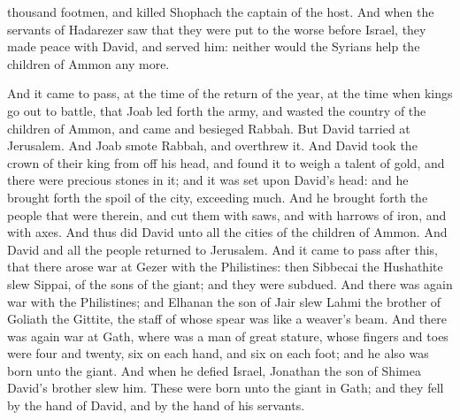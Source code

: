 thousand footmen, and killed Shophach the captain of the host. And when the servants of Hadarezer saw that they were put to the worse before Israel, they made peace with David, and served him: neither would the Syrians help the children of Ammon any more. 

And it came to pass, at the time of the return of the year, at the time when kings go out to battle, that Joab led forth the army, and wasted the country of the children of Ammon, and came and besieged Rabbah. But David tarried at Jerusalem. And Joab smote Rabbah, and overthrew it. And David took the crown of their king from off his head, and found it to weigh a talent of gold, and there were precious stones in it; and it was set upon David’s head: and he brought forth the spoil of the city, exceeding much. And he brought forth the people that were therein, and cut them with saws, and with harrows of iron, and with axes. And thus did David unto all the cities of the children of Ammon. And David and all the people returned to Jerusalem.  And it came to pass after this, that there arose war at Gezer with the Philistines: then Sibbecai the Hushathite slew Sippai, of the sons of the giant; and they were subdued. And there was again war with the Philistines; and Elhanan the son of Jair slew Lahmi the brother of Goliath the Gittite, the staff of whose spear was like a weaver’s beam. And there was again war at Gath, where was a man of great stature, whose fingers and toes were four and twenty, six on each hand, and six on each foot; and he also was born unto the giant. And when he defied Israel, Jonathan the son of Shimea David’s brother slew him. These were born unto the giant in Gath; and they fell by the hand of David, and by the hand of his servants. 

